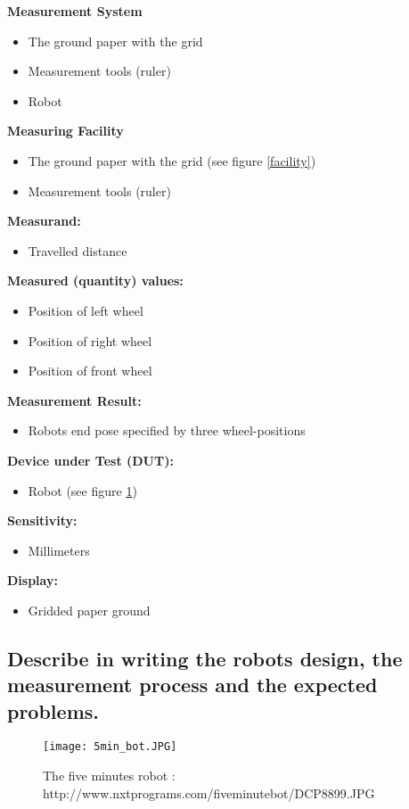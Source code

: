 \documentclass[paper=a4, fontsize=11pt]{scrartcl} %
\numberwithin{equation}{section} %
\numberwithin{figure}{section} %
\numberwithin{table}{section} %
\begin{document}
	\textbf{Measurement System}
	\begin{itemize}
		\item The ground paper with the grid
		\item Measurement tools (ruler)
		\item Robot
	\end{itemize}
	\textbf{Measuring Facility}
	\begin{itemize}
		\item The ground paper with the grid (see figure \ref{facility})
		\item Measurement tools (ruler)
	\end{itemize}
	\textbf{Measurand:}
	\begin{itemize}
		\item Travelled distance
	\end{itemize}
	\textbf{Measured (quantity) values:}
	\begin{itemize}
		\item Position of left wheel
		\item Position of right wheel
		\item Position of front wheel
	\end{itemize}
	\textbf{Measurement Result:}
	\begin{itemize}
		\item Robots end pose specified by three wheel-positions
	\end{itemize}
	\textbf{Device under Test (DUT):}
	\begin{itemize}
		\item Robot (see figure \ref{fig_5_min_bot})
	\end{itemize}
	\textbf{Sensitivity:}
	\begin{itemize}
		\item Millimeters
	\end{itemize}
	\textbf{Display:}
	\begin{itemize}
		\item Gridded paper ground
	\end{itemize}



\subsection{Describe in writing the robots design, the measurement process and the expected problems.}
\begin{figure}[ht]
	\centering
  \texttt{[image: 5min\_bot.JPG]}
	\caption{The five minutes robot : http://www.nxtprograms.com/five\textunderscore minute\textunderscore bot/DCP\textunderscore 8899.JPG}
	\label{fig_5_min_bot}
\end{figure}
\end{document}
